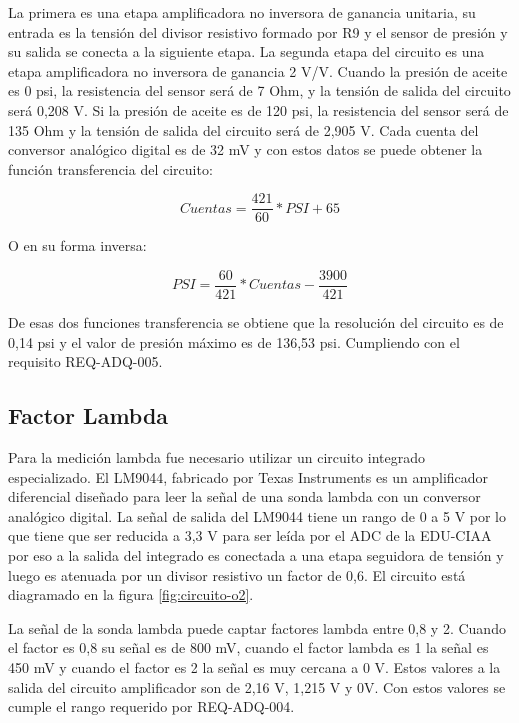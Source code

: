 La primera es una etapa amplificadora no inversora de ganancia unitaria, su entrada es la tensión del divisor resistivo formado por R9 y el sensor de presión y su salida se conecta a la siguiente etapa. La segunda etapa del circuito es una etapa amplificadora no inversora de ganancia 2 V/V.
Cuando la presión de aceite es 0 psi, la resistencia del sensor será de 7 Ohm, y la tensión de salida del circuito será 0,208 V. Si la presión de aceite es de 120 psi, la resistencia del sensor será de 135 Ohm y la tensión de salida del circuito será de 2,905 V. Cada cuenta del conversor analógico digital es de 32 mV y con estos datos se puede obtener la función transferencia del circuito:

\[ Cuentas = \frac{421}{60} * PSI + 65\]

O en su forma inversa:

\[ PSI = \frac{60}{421} * Cuentas - \frac{3900}{421} \]

De esas dos funciones transferencia se obtiene que la resolución del circuito es de 0,14 psi y el valor de presión máximo es de 136,53 psi. Cumpliendo con el requisito REQ-ADQ-005.

\subsection{Factor Lambda}

Para la medición lambda fue necesario utilizar un circuito integrado especializado. El LM9044, fabricado por Texas Instruments es un amplificador diferencial diseñado para leer la señal de una sonda lambda con un conversor analógico digital. La señal de salida del LM9044 tiene un rango de 0 a 5 V por lo que tiene que ser reducida a 3,3 V para ser leída por el ADC de la EDU-CIAA por eso a la salida del integrado es conectada a una etapa seguidora de tensión y luego es atenuada por un divisor resistivo un factor de 0,6. El circuito está diagramado en la figura \ref{fig:circuito-o2}.

La señal de la sonda lambda puede captar factores lambda entre 0,8 y 2. Cuando el factor es 0,8 su señal es de 800 mV, cuando el factor lambda es 1 la señal es 450 mV y cuando el factor es 2 la señal es muy cercana a 0 V. Estos valores a la salida del circuito amplificador son de 2,16 V, 1,215 V y 0V. Con estos valores se cumple el rango requerido por REQ-ADQ-004.

